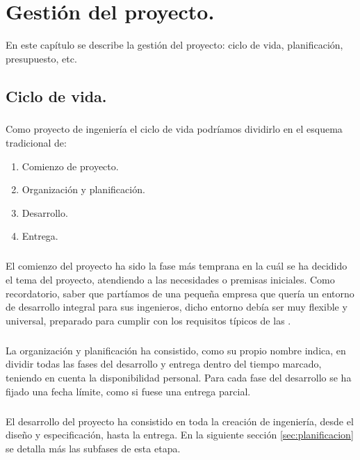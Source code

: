 \chapter{Gestión del proyecto.}\label{sec:gestion}

En este capítulo se describe la gestión del proyecto: ciclo de vida, planificación,
presupuesto, etc.

\section{Ciclo de vida.}

\paragraph{}Como proyecto de ingeniería el ciclo de vida podríamos dividirlo en el
esquema tradicional de:

\begin{enumerate}
  \item Comienzo de proyecto.
  \item Organización y planificación.
  \item Desarrollo.
  \item Entrega.
\end{enumerate}

\paragraph{}El comienzo del proyecto ha sido la fase más temprana en la cuál se ha
decidido el tema del proyecto, atendiendo a las necesidades o premisas iniciales. Como
recordatorio, saber que partíamos de una pequeña empresa que quería un entorno de desarrollo
integral para sus ingenieros, dicho entorno debía ser muy flexible y universal, preparado
para cumplir con los requisitos típicos de las .

\paragraph{}La organización y planificación ha consistido, como su propio nombre indica,
en dividir todas las fases del desarrollo y entrega dentro del tiempo marcado, teniendo
en cuenta la disponibilidad personal. Para cada fase del desarrollo se ha fijado una
fecha límite, como si fuese una entrega parcial.

\paragraph{}El desarrollo del proyecto ha consistido en toda la creación de ingeniería,
desde el diseño y especificación, hasta la entrega. En la siguiente sección \ref{sec:planificacion}
se detalla más las subfases de esta etapa.


